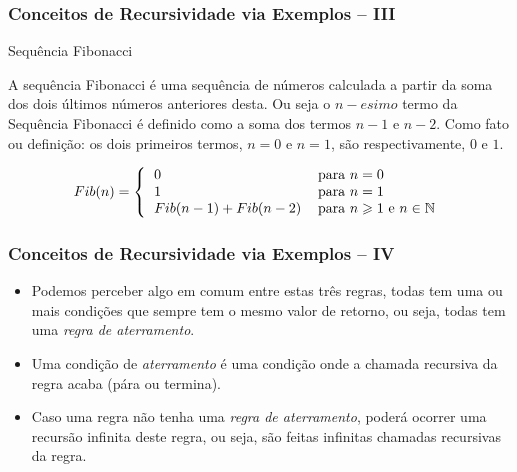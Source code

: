 \begin{frame}[fragile]
\frametitle{Conceitos de Recursividade via Exemplos -- III}

\begin{block}{Sequência Fibonacci}

A sequência Fibonacci é uma sequência de números calculada a partir da soma dos
dois últimos números anteriores desta. Ou seja o $n-esimo$ termo da Sequência Fibonacci é definido como a soma dos termos $n-1$ e $n-2$. Como fato ou definição: os dois primeiros termos, $n = 0$ e $n = 1$, são respectivamente, $0$ e $1$.
      
      \[
      Fib(n)=\left\{
      \begin{tabular}[c]{ll}%
          $0$ & para $n = 0$\\
          $1$ & para $n = 1$\\
          $Fib(n-1) + Fib(n-2)$ & para $n\geqslant1$ e $n \in \mathbb{N}$
      \end{tabular}
      \right.
      \]
 
\end{block}    
\end{frame}

\begin{frame}[fragile]

\frametitle{Conceitos de Recursividade via Exemplos -- IV}

  \begin{itemize}
      
      \item Podemos perceber algo em comum entre estas três regras, todas tem uma ou mais
      condições que sempre tem o mesmo valor de retorno, ou seja, todas tem uma \textit{regra de  aterramento}.
      
      \pause
      \item Uma condição de \textit{aterramento} é uma condição onde a chamada recursiva da regra
      acaba (pára ou termina).
      
       \pause
      \item Caso uma regra não tenha uma \textit{regra de aterramento}, poderá ocorrer uma recursão infinita deste regra, ou seja, são feitas infinitas chamadas recursivas
      da regra.
  \end{itemize}

\end{frame}

